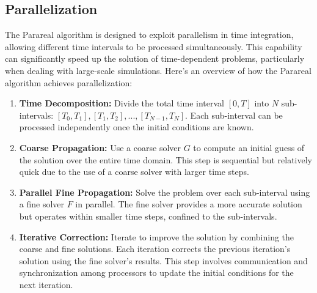 \documentclass[a4paper,12pt,french]{article}
\begin{document}
\subsection{Parallelization}
The Parareal algorithm is designed to exploit parallelism in time integration, allowing different time intervals to be processed simultaneously. This capability can significantly speed up the solution of time-dependent problems, particularly when dealing with large-scale simulations. 
Here’s an overview of how the Parareal algorithm achieves parallelization:
\begin{enumerate}
    \item \textbf{Time Decomposition:} Divide the total time interval \([0, T]\) into \(N\) sub-intervals: \([T_0, T_1], [T_1, T_2], ..., [T_{N-1}, T_N]\). Each sub-interval can be processed independently once the initial conditions are known.
    \item \textbf{Coarse Propagation:} Use a coarse solver \(G\) to compute an initial guess of the solution over the entire time domain. This step is sequential but relatively quick due to the use of a coarse solver with larger time steps.
    \item \textbf{Parallel Fine Propagation:} Solve the problem over each sub-interval using a fine solver \(F\) in parallel. The fine solver provides a more accurate solution but operates within smaller time steps, confined to the sub-intervals.
    \item \textbf{Iterative Correction:} Iterate to improve the solution by combining the coarse and fine solutions. Each iteration corrects the previous iteration's solution using the fine solver's results. This step involves communication and synchronization among processors to update the initial conditions for the next iteration.
\end{enumerate}
\end{document}
